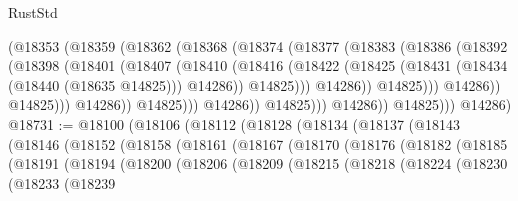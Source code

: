 \begin{lexlean}{RustStd}
\begin{coremodule}
                                (@18353
                                  (@18359
                                    (@18362
                                      (@18368
                                        (@18374
                                          (@18377
                                            (@18383
                                              (@18386
                                                (@18392
                                                  (@18398
                                                    (@18401
                                                      (@18407
                                                        (@18410
                                                          (@18416
                                                            (@18422
                                                              (@18425
                                                                (@18431
                                                                  (@18434 (@18440 (@18635 @14825)))
                                                                  @14286))
                                                              @14825)))
                                                        @14286))
                                                    @14825)))
                                              @14286))
                                          @14825)))
                                    @14286))
                                @14825)))
                          @14286))
                      @14825)))
                @14286))
            @14825)))
      @14286)
@18731 := @18100
    (@18106
      (@18112
        (@18128
          (@18134
            (@18137
              (@18143
                (@18146
                  (@18152
                    (@18158
                      (@18161
                        (@18167
                          (@18170
                            (@18176
                              (@18182
                                (@18185
                                  (@18191
                                    (@18194
                                      (@18200
                                        (@18206
                                          (@18209
                                            (@18215
                                              (@18218
                                                (@18224
                                                  (@18230
                                                    (@18233
                                                      (@18239

\end{coremodule}
\end{lexlean}

